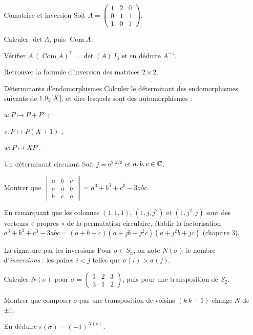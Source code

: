 \begin{exercice}[2]{Comatrice et inversion}
Soit $A=\begin{pmatrix}1&2&0\\0&1&1\\1&0&1\end{pmatrix}$.
\begin{questions}
  \item Calculer $\det A$, puis $\operatorname{Com}A$.
  \item Vérifier $A\,(\operatorname{Com}A)^{\mathsf T}=\det(A)\,I_3$ et en
    déduire $A^{-1}$.
  \item Retrouver la formule d'inversion des matrices $2\times2$.
\end{questions}
\end{exercice}

\begin{exercice}[2]{Déterminants d'endomorphismes}
Calculer le déterminant des endomorphismes suivants de $1.9_2[X]$, et dire
lesquels sont des automorphismes :
\begin{questions}
  \item $u:P\mapsto P+P'$ ;
  \item $v:P\mapsto P(X+1)$ ;
  \item $w:P\mapsto XP'$.
\end{questions}
\end{exercice}

\begin{exercice}[2]{Un déterminant circulant}
Soit $j=\mathrm{e}^{2\mathrm{i}\pi/3}$ et $a,b,c\in\mathbb{C}$.
\begin{questions}
  \item Montrer que
    $\begin{vmatrix}a&b&c\\c&a&b\\b&c&a\end{vmatrix}
    =a^{3}+b^{3}+c^{3}-3abc$.
  \item En remarquant que les colonnes $(1,1,1)$, $(1,j,j^{2})$ et
    $(1,j^{2},j)$ sont des vecteurs « propres » de la permutation
    circulaire, établir la factorisation
    $a^{3}+b^{3}+c^{3}-3abc=(a+b+c)(a+jb+j^{2}c)(a+j^{2}b+jc)$
    (chapitre 3).
\end{questions}
\end{exercice}

\begin{exercice}[2]{La signature par les inversions}
Pour $\sigma\in S_n$, on note $N(\sigma)$ le nombre d'\emph{inversions} :
les paires $i<j$ telles que $\sigma(i)>\sigma(j)$.
\begin{questions}
  \item Calculer $N(\sigma)$ pour
    $\sigma=\begin{pmatrix}1&2&3\\3&1&2\end{pmatrix}$, puis pour une
    transposition de $S_2$.
  \item Montrer que composer $\sigma$ par une transposition de voisins
    $(k\ k{+}1)$ change $N$ de $\pm1$.
  \item En déduire $\varepsilon(\sigma)=(-1)^{N(\sigma)}$.
\end{questions}
\end{exercice}

